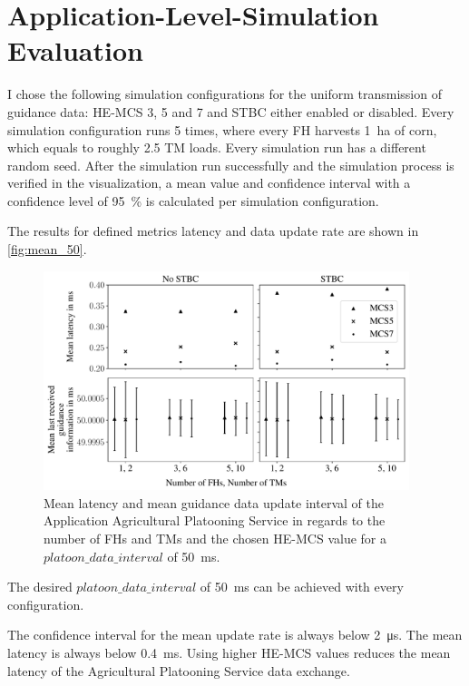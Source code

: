 \section{Application-Level-Simulation Evaluation}
I chose the following simulation configurations for the uniform transmission of guidance data: \ac{HE}-\ac{MCS} 3, 5 and 7 and
\ac{STBC} either enabled or disabled.
Every simulation configuration runs \num{5} times, where every \ac{FH} harvests \SI{1}{\hectare} of corn, which equals to roughly
\num{2.5} \ac{TM} loads.
Every simulation run has a different random seed.
After the simulation run successfully and the simulation process is verified in the visualization,
a mean value and confidence interval with a confidence level of
\SI{95}{\percent} is calculated per simulation configuration.

The results for defined metrics latency and data update rate are shown in \autoref{fig:mean_50}.


\begin{figure}[]%
	\centering
	\includegraphics[width=0.95\textwidth]{figures/latency_lastUpdate50ms}
	\caption{Mean latency and mean guidance data update interval of the Application Agricultural Platooning Service in regards to the number of \ac{FH}s and \ac{TM}s and
	the chosen \ac{HE}-\ac{MCS} value for a $platoon\_data\_interval$ of \SI{50}{\milli\second}.}
	\label{fig:mean_50}%
\end{figure}

The desired $platoon\_data\_interval$ of \SI{50}{\milli\second} can be achieved with every
configuration.

The confidence interval for the mean update rate is always below \SI{2}{\micro\second}.
The mean latency is always below \SI{0.4}{\milli\second}.
Using higher \ac{HE}-\ac{MCS} values reduces the mean latency of
the Agricultural Platooning Service data exchange.

